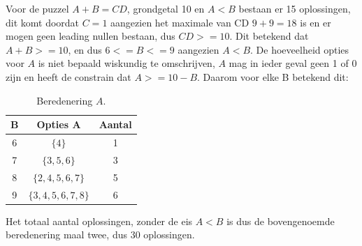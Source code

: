 \documentclass[twocolumn,10pt]{article}
\begin{document}
Voor de puzzel $A+B=CD$, grondgetal 10 en $A < B$ bestaan er 15 oplossingen, dit komt doordat $C=1$ aangezien het maximale van CD $9+9=18$ is en er mogen geen leading nullen bestaan, dus $CD >= 10$. Dit betekend dat $A+B >= 10$, en dus $6 <= B <= 9$ aangezien $A < B$. De hoeveelheid opties voor $A$ is niet bepaald wiskundig te omschrijven, $A$ mag in ieder geval geen 1 of 0 zijn en heeft de constrain dat $A >= 10 - B$. Daarom voor elke B betekend dit:
\begin{table}[h]
    \centering
    \caption{Beredenering $A$.}
        \begin{tabular}{@{}ccc@{}}
            \toprule
            B & Opties A & Aantal \\ 
            \midrule
            6 & $\{4\}$ & 1 \\
            7 & $\{3, 5, 6\}$ & 3 \\
            8 & $\{2, 4, 5, 6, 7\}$ & 5 \\
            9 & $\{3, 4, 5, 6, 7, 8\}$ & 6 \\
            \bottomrule
        \end{tabular}
\end{table}
\FloatBarrier
Het totaal aantal oplossingen, zonder de eis $A<B$ is dus de bovengenoemde beredenering maal twee, dus 30 oplossingen.


\begin{table}[h]
    \centering
    \caption{Resultaten van verschillende puzzels.}
\end{table}
\FloatBarrier
\end{document}
